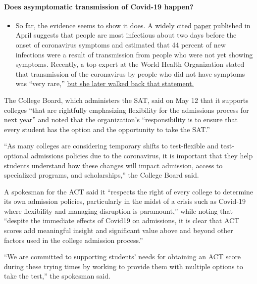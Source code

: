 \begin{itemize}
{  \paragraph{Does asymptomatic transmission of Covid-19
  happen?}\label{does-asymptomatic-transmission-of-covid-19-happen}}

  \begin{itemize}
  \tightlist
  \item
    So far, the evidence seems to show it does. A widely cited
    \href{https://www.nature.com/articles/s41591-020-0869-5}{paper}
    published in April suggests that people are most infectious about
    two days before the onset of coronavirus symptoms and estimated that
    44 percent of new infections were a result of transmission from
    people who were not yet showing symptoms. Recently, a top expert at
    the World Health Organization stated that transmission of the
    coronavirus by people who did not have symptoms was ``very rare,''
    \href{https://www.nytimes.com/2020/06/09/world/coronavirus-updates.html?action=click\&pgtype=Article\&state=default\&region=MAIN_CONTENT_3\&context=storylines_faq\#link-1f302e21}{but
    she later walked back that statement.}
  \end{itemize}
\end{itemize}

The College Board, which administers the SAT, said on May 12 that it
supports colleges ``that are rightfully emphasizing flexibility for the
admissions process for next year'' and noted that the organization's
``responsibility is to ensure that every student has the option and the
opportunity to take the SAT.''

``As many colleges are considering temporary shifts to test-flexible and
test-optional admissions policies due to the coronavirus, it is
important that they help students understand how these changes will
impact admission, access to specialized programs, and scholarships,''
the College Board said.

A spokesman for the ACT said it ``respects the right of every college to
determine its own admission policies, particularly in the midst of a
crisis such as Covid-19 where flexibility and managing disruption is
paramount,'' while noting that ``despite the immediate effects of
Covid19 on admissions, it is clear that ACT scores add meaningful
insight and significant value above and beyond other factors used in the
college admission process.''

``We are committed to supporting students' needs for obtaining an ACT
score during these trying times by working to provide them with multiple
options to take the test,'' the spokesman said.

